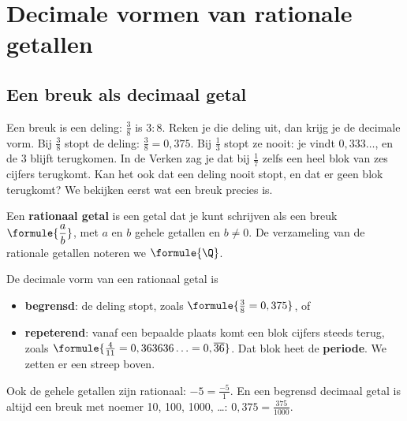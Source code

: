 \begin{oefeningen}[Start]

\end{oefeningen}

\section{Decimale vormen van rationale getallen}

\subsection{Een breuk als decimaal getal}

Een breuk is een deling: $\tfrac38$ is $3 : 8$. Reken je die deling uit, dan krijg je de decimale vorm. Bij $\tfrac38$ stopt de deling: $\tfrac38 = 0,375$. Bij $\tfrac13$ stopt ze nooit: je vindt $0,333\ldots$, en de 3 blijft terugkomen. In de Verken zag je dat bij $\tfrac17$ zelfs een heel blok van zes cijfers terugkomt. Kan het ook dat een deling nooit stopt, en dat er geen blok terugkomt? We bekijken eerst wat een breuk precies is.

\begin{theorie}
Een \textbf{\textcolor{accent}{rationaal getal}} is een getal dat je kunt schrijven als een breuk $\formule{\dfrac ab}$, met $a$ en $b$ gehele getallen en $b \neq 0$. De verzameling van de rationale getallen noteren we $\formule{\Q}$.

De decimale vorm van een rationaal getal is
\begin{itemize}
\item \textbf{\textcolor{accent}{begrensd}}: de deling stopt, zoals $\formule{\tfrac38 = 0,375}$, of
\item \textbf{\textcolor{accent}{repeterend}}: vanaf een bepaalde plaats komt een blok cijfers steeds terug, zoals $\formule{\tfrac{4}{11} = 0,363636\ldots = 0,\overline{36}}$. Dat blok heet de \textbf{\textcolor{accent}{periode}}. We zetten er een streep boven.
\end{itemize}
\end{theorie}

Ook de gehele getallen zijn rationaal: $-5 = \tfrac{-5}{1}$. En een begrensd decimaal getal is altijd een breuk met noemer 10, 100, 1000, \ldots: $0,375 = \tfrac{375}{1000}$.

